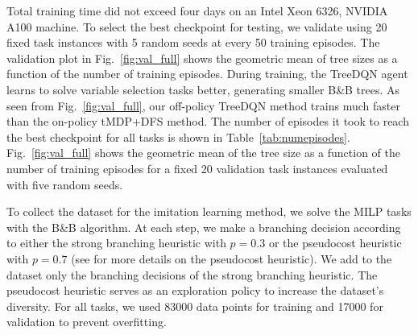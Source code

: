 \documentclass[preprint,12pt]{elsarticle} %
\theoremstyle{plain}
\theoremstyle{definition}
\theoremstyle{remark}
\begin{document}
Total training time did not exceed four days on an Intel Xeon 6326, NVIDIA A100 machine. To select the best checkpoint for testing, we validate using 20 fixed task instances with 5 random seeds at every 50 training episodes. The validation plot in Fig.~\ref{fig:val_full} shows the geometric mean of tree sizes as a function of the number of training episodes. During training, the TreeDQN agent learns to solve variable selection tasks better, generating smaller B\&B trees. As seen from Fig.~\ref{fig:val_full}, our off-policy TreeDQN method trains much faster than the on-policy tMDP+DFS method. The number of episodes it took to reach the best checkpoint for all tasks is shown in Table~\ref{tab:numepisodes}. Fig.~\ref{fig:val_full} shows the geometric mean of the tree size as a function of the number of training episodes for a fixed 20 validation task instances evaluated with five random seeds. 

To collect the dataset for the imitation learning method, we solve the MILP tasks with the B\&B algorithm. At each step, we make a branching decision according to either the strong branching heuristic with $p=0.3$ or the pseudocost heuristic with $p=0.7$ (see \cite{ecole} for more details on the pseudocost heuristic). We add to the dataset only the branching decisions of the strong branching heuristic. The pseudocost heuristic serves as an exploration policy to increase the dataset's diversity. For all tasks, we used 83000 data points for training and 17000 for validation to prevent overfitting. 
\end{document}
